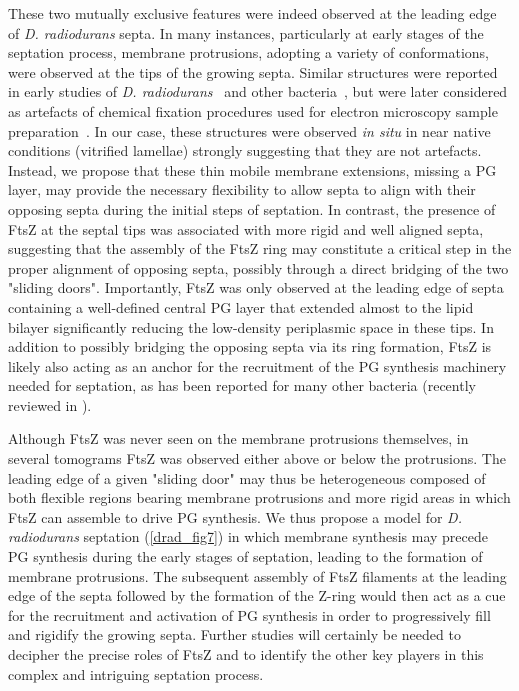 These two mutually exclusive features were indeed observed at the leading edge of \textit{D. radiodurans} septa.
In many instances, particularly at early stages of the septation process, membrane protrusions, adopting a variety of conformations, were observed at the tips of the growing septa.
Similar structures were reported in early studies of \textit{D. radiodurans}~\cite{thornleyFineStructureMicrococcus1965,sleytrStudyFreezeetchingFine1973} and other bacteria~\cite{suganumaStudiesFineStructure1966,pontefractMesosomesEscherichiaColi1969}, but were later considered as artefacts of chemical fixation procedures used for electron microscopy sample preparation~\cite{ryterContributionNewCryomethods1988,dubochetElectronMicroscopyFrozenhydrated1983,liedtkeHowAdvancesCryoelectron2022}.
In our case, these structures were observed \textit{in situ} in near native conditions (vitrified lamellae) strongly suggesting that they are not artefacts.
Instead, we propose that these thin mobile membrane extensions, missing a PG layer, may provide the necessary flexibility to allow septa to align with their opposing septa during the initial steps of septation.
In contrast, the presence of FtsZ at the septal tips was associated with more rigid and well aligned septa, suggesting that the assembly of the FtsZ ring may constitute a critical step in the proper alignment of opposing septa, possibly through a direct bridging of the two "sliding doors".
Importantly, FtsZ was only observed at the leading edge of septa containing a well-defined central PG layer that extended almost to the lipid bilayer significantly reducing the low-density periplasmic space in these tips.
In addition to possibly bridging the opposing septa via its ring formation, FtsZ is likely also acting as an anchor for the recruitment of the PG synthesis machinery needed for septation, as has been reported for many other bacteria (recently reviewed in \citet{barrowsFtsZDynamicsBacterial2021,mcquillenInsightsStructureFunction2020,cameronInsightsAssemblyRegulation2024}).

Although FtsZ was never seen on the membrane protrusions themselves, in several tomograms FtsZ was observed either above or below the protrusions.
The leading edge of a given "sliding door" may thus be heterogeneous composed of both flexible regions bearing membrane protrusions and more rigid areas in which FtsZ can assemble to drive PG synthesis.
We thus propose a model for \textit{D. radiodurans} septation (\autoref{drad_fig7}) in which membrane synthesis may precede PG synthesis during the early stages of septation, leading to the formation of membrane protrusions.
The subsequent assembly of FtsZ filaments at the leading edge of the septa followed by the formation of the Z-ring would then act as a cue for the recruitment and activation of PG synthesis in order to progressively fill and rigidify the growing septa.
Further studies will certainly be needed to decipher the precise roles of FtsZ and to identify the other key players in this complex and intriguing septation process.

